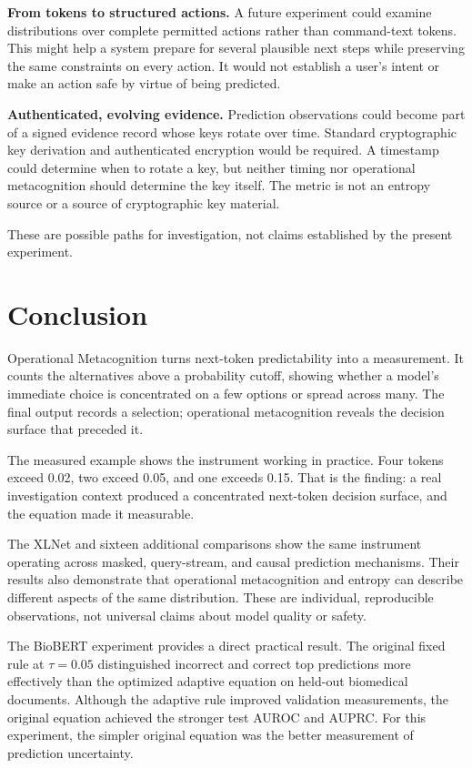 \documentclass[11pt,a4paper]{article}
\begin{document}
\textbf{From tokens to structured actions.} A future experiment could examine distributions over complete permitted actions rather than command-text tokens. This might help a system prepare for several plausible next steps while preserving the same constraints on every action. It would not establish a user's intent or make an action safe by virtue of being predicted.

\textbf{Authenticated, evolving evidence.} Prediction observations could become part of a signed evidence record whose keys rotate over time. Standard cryptographic key derivation and authenticated encryption would be required. A timestamp could determine when to rotate a key, but neither timing nor operational metacognition should determine the key itself. The metric is not an entropy source or a source of cryptographic key material.

These are possible paths for investigation, not claims established by the present experiment.

\section{Conclusion}
Operational Metacognition turns next-token predictability into a measurement. It counts the alternatives above a probability cutoff, showing whether a model's immediate choice is concentrated on a few options or spread across many. The final output records a selection; operational metacognition reveals the decision surface that preceded it.

The measured example shows the instrument working in practice. Four tokens exceed 0.02, two exceed 0.05, and one exceeds 0.15. That is the finding: a real investigation context produced a concentrated next-token decision surface, and the equation made it measurable.

The XLNet and sixteen additional comparisons show the same instrument operating across masked, query-stream, and causal prediction mechanisms. Their results also demonstrate that operational metacognition and entropy can describe different aspects of the same distribution. These are individual, reproducible observations, not universal claims about model quality or safety.

The BioBERT experiment provides a direct practical result. The original fixed rule at $\tau=0.05$ distinguished incorrect and correct top predictions more effectively than the optimized adaptive equation on held-out biomedical documents. Although the adaptive rule improved validation measurements, the original equation achieved the stronger test AUROC and AUPRC. For this experiment, the simpler original equation was the better measurement of prediction uncertainty.
\end{document}
